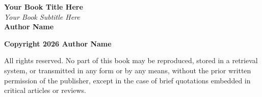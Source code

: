 \clearpage
\thispagestyle{empty}
\begin{center}
\vspace*{5cm}
\Huge \textbf{Your Book Title Here} \\
\vspace{0.5cm}
\large \textit{Your Book Subtitle Here} \\
\vspace{1cm}
\Large \textbf{Author Name} \\
\vfill

\normalsize
\textbf{Copyright \textcopyright{} 2026 Author Name}

\vspace{0.5cm}
\small
All rights reserved. No part of this book may be reproduced, stored in a retrieval system, or transmitted in any form or by any means, without the prior written permission of the publisher, except in the case of brief quotations embedded in critical articles or reviews.
\vspace*{4cm}
\end{center}
\newpage
